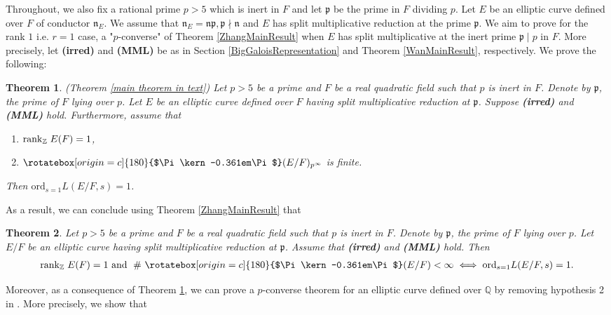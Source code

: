 \documentclass[reqno,10pt]{amsart}
\newcommand{\q}{\mathbb{Q}}
\newcommand{\z}{\mathbb{Z}}
\newcommand{\p}{\mathfrak{p}}
\newcommand{\n}{\mathfrak{n}}
\newcommand{\Varpi}{\rotatebox[origin=c]{180}{$\Pi\kern-0.361em\Pi$}}
\theoremstyle{plain}
\newtheorem{thm}{Theorem}[section]
\theoremstyle{definition}
\begin{document}
Throughout, we also fix a rational prime $p>5$ which is inert in $F$ and let $\p$ be the prime in $F$ dividing $p$. Let $E$ be an elliptic curve defined over $F$ of conductor $\n_E$. We assume that $\n_E = \n\p, \p \nmid \n$ and $E$ has split multiplicative reduction at the prime $\p$. We aim to prove for the rank $1$ i.e. $r=1$ case, a "$p$-converse" of Theorem \ref{ZhangMainResult} when $E$ has split multiplicative at the inert prime $\p \mid p$ in $F$. More precisely, let \textbf{(irred)} and \textbf{(MML)} be as in Section \ref{BigGaloisRepresentation} and Theorem \ref{WanMainResult}, respectively. We prove the following:
\begin{thm} \label{Our Main Thm} (Theorem \ref{main theorem in text})
     Let $p > 5$ be a prime and $F$ be a real quadratic field such that $p$ is inert in $F$. Denote by $\p$, the prime of $F$ lying over $p$. Let $E$ be an elliptic curve defined over $F$ having split multiplicative reduction at $\p$. Suppose \textbf{(irred)} and \textbf{(MML)} hold. Furthermore, assume that 
    \begin{enumerate}
        \item $\mathrm{rank}_\z \hspace{0.01mm} \hspace{1mm} E(F) = 1$,

        \item $\Varpi(E/F)_{p^\infty}$ is finite.
    \end{enumerate}
    Then $\mathrm{ord}_{s=1} L(E/F,s) = 1$.
\end{thm}

As a result, we can conclude using Theorem \ref{ZhangMainResult} that

\begin{thm}
    Let $p > 5$ be a prime and $F$ be a real quadratic field such that $p$ is inert in $F$. Denote by $\p$, the prime of $F$ lying over $p$. Let $E/F$ be an elliptic curve having split multiplicative reduction at $\p$. Assume that \textbf{(irred)} and \textbf{(MML)} hold. Then
    \begin{align*}
        \mathrm{rank}_\z \hspace{0.01mm} \hspace{1mm} E(F) = 1 \text { and } \hspace{1mm} \# \ \Varpi(E/F) < \infty \iff \mathrm{ord}_{s=1} L(E/F,s) = 1.
    \end{align*}
\end{thm}

Moreover, as a consequence of Theorem \ref{Our Main Thm}, we can prove a $p$-converse theorem for an elliptic curve defined over $\q$ by removing hypothesis 2 in \cite[Theorem A]{Rodolfo}. More precisely, we show that
\end{document}
